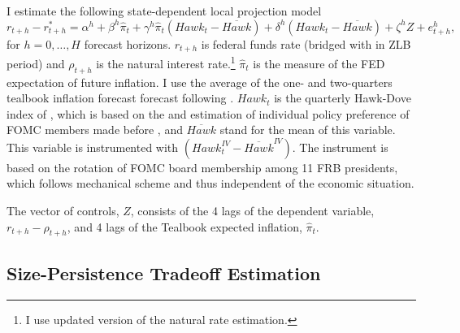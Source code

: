 \documentclass[12pt]{article}
\numberwithin{equation}{section}
\begin{document}
I estimate the following state-dependent local projection model 
\begin{equation}
    r_{t+h}-r^*_{t+h}=\alpha^h+\beta^h \hat\pi_t+\gamma^h \hat\pi_t\left(\mathit{Hawk}_{t}-\overline{\mathit{Hawk}}\right)+\delta^h\left(\mathit{Hawk}_{t}-\overline{\mathit{Hawk}}\right)+\zeta^hZ+e_{t+h}^h,
\end{equation}
for $h=0,\dots, H$ forecast horizons. $r_{t+h}$ is federal funds rate (bridged with \citet{WuXia2016} in ZLB period) and $\rho_{t+h}$ is the \citet{LW2003} natural interest rate.\footnote{I use \citet{HLW2023} updated version of the \citet{LW2003} natural rate estimation.}
$\hat\pi_t$ is the measure of the FED expectation of future inflation. I use the average of the one- and two-quarters  tealbook inflation forecast forecast following \citet{CoibionGorodnichenko2011}. 
$\mathit{Hawk}_t$ is the quarterly Hawk-Dove index of \citet{HIM2023}, which is based on the \citet{Istrefi2019}and \citet{BordoIstrefi2023} estimation of individual policy preference of FOMC members made before , and $\overline{\mathit{Hawk}}$ stand for the mean of this variable.
This variable is instrumented with $\left(\mathit{Hawk}_{t}^\mathit{IV}-\overline{\mathit{Hawk}}^\mathit{IV}\right)$. The instrument is based on the rotation of FOMC board membership among 11 FRB presidents, which follows mechanical scheme and thus independent of the economic situation.

The vector of controls, $Z$, consists of the 4 lags of the dependent variable, $r_{t+h}-\rho_{t+h}$, and 4 lags of the Tealbook expected inflation, $\hat\pi_t$.

\subsection{Size-Persistence Tradeoff Estimation}
\end{document}
